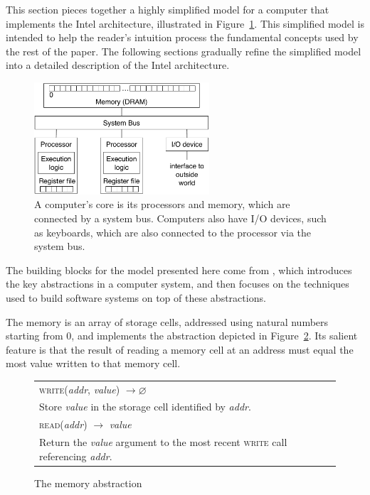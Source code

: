 \label{sec:resources}

This section pieces together a highly simplified model for a computer that
implements the Intel architecture, illustrated in
Figure~\ref{fig:computer_model}. This simplified model is intended to help the
reader's intuition process the fundamental concepts used by the rest of the
paper. The following sections gradually refine the simplified model into a
detailed description of the Intel architecture.

\begin{figure}[hbt]
  \centering
  \includegraphics[width=65mm]{figures/computer_model.pdf}
  \caption{
    A computer's core is its processors and memory, which are connected by a
    system bus. Computers also have I/O devices, such as keyboards, which are
    also connected to the processor via the system bus.
  }
  \label{fig:computer_model}
\end{figure}


The building blocks for the model presented here come from
\cite{saltzer2009systemdesign}, which introduces the key abstractions in a
computer system, and  then focuses on the techniques used to build software
systems on top of these abstractions.

The memory is an array of storage cells, addressed using natural numbers
starting from 0, and implements the abstraction depicted in
Figure~\ref{fig:memory_abstraction}. Its salient feature is that the result of
reading a memory cell at an address must equal the most value written to that
memory cell.

\begin{figure}[hbt]
  \centering
  \begin{tabularx}{\columnwidth}{| X |}
  \hline
  \textsc{write}(\textit{addr}, \textit{value}) $ \rightarrow \varnothing $ \\
  Store \textit{value} in the storage cell identified by \textit{addr}. \\
  \hline
  \textsc{read}(\textit{addr}) $ \rightarrow $ \textit{value} \\
  Return the \textit{value} argument to the most recent \textsc{write} call
  referencing \textit{addr}. \\
  \hline
  \end{tabularx}
  \caption{The memory abstraction}
  \label{fig:memory_abstraction}
\end{figure}

